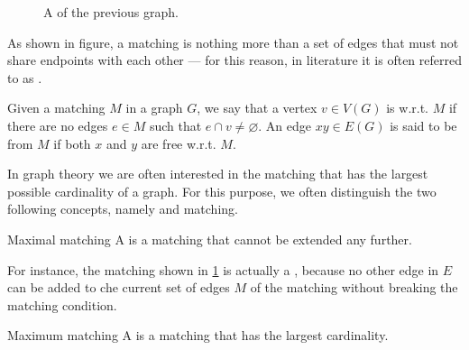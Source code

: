 \documentclass[a4paper, 12pt]{report}
\begin{document}
    \begin{figure}[H]
        \centering
        \caption{A  of the previous graph.}
        \label{matching}
    \end{figure}

    As shown in figure, a matching is nothing more than a set of edges that must not share endpoints with each other — for this reason, in literature it is often referred to as . 

    Given a matching $M$ in a graph $G$, we say that a vertex $v \in V(G)$ is  w.r.t. $M$ if there are no edges $e \in M$ such that $e \cap v \neq \varnothing$. An edge $xy \in E(G)$ is said to be  from $M$ if both $x$ and $y$ are free w.r.t. $M$.

    In graph theory we are often interested in the matching that has the largest possible cardinality of a graph. For this purpose, we often distinguish the two following concepts, namely  and  matching.

    \begin{frameddefn}{Maximal matching}
        A  is a matching that cannot be extended any further.
    \end{frameddefn}
    
    For instance, the matching shown in \cref{matching} is actually a , because no other edge in $E$ can be added to che current set of edges $M$ of the matching without breaking the matching condition.

    \begin{frameddefn}{Maximum matching}
        A  is a matching that has the largest cardinality.
    \end{frameddefn}
\end{document}
